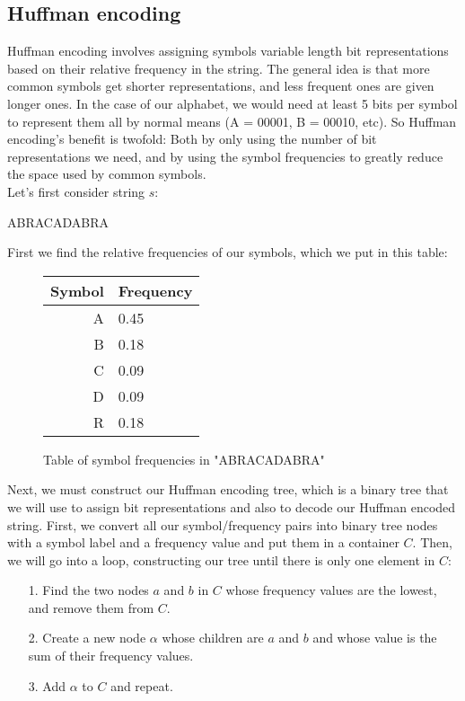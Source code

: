 \documentclass[11pt]{article}
\begin{document}
\subsection{Huffman encoding}\label{huffman-subsect}
Huffman encoding involves assigning symbols variable length bit representations based on their relative 
frequency in the string. The general idea is that more common symbols get shorter representations, 
and less frequent ones are given longer ones. In the case of our alphabet, we would need at least 5 
bits per symbol to represent them all by normal means (A = 00001, B = 00010, etc). So Huffman encoding's 
benefit is twofold: Both by only using the number of bit representations we need, 
and by using the symbol frequencies to greatly reduce the space used by common symbols.\\
Let's first consider string $s$:
\begin{center}ABRACADABRA\end{center}
First we find the relative frequencies of our symbols, which we put in this table:\\
\begin{figure}[H]\begin{center}\begin{tabular}{ r | l }
	Symbol & Frequency \\
	\hline
	A & 0.45 \\
	B & 0.18 \\
	C & 0.09 \\
	D & 0.09 \\
	R & 0.18 \\
\end{tabular}\caption{Table of symbol frequencies in "ABRACADABRA"}\end{center}\end{figure}
Next, we must construct our Huffman encoding tree, which is a binary tree that we will use to assign bit representations 
and also to decode our Huffman encoded string. First, we convert all our symbol/frequency pairs into binary tree nodes 
with a symbol label and a frequency value and put them in a container $C$. Then, we will go into a loop, constructing 
our tree until there is only one element in $C$:
\begin{itemize}
	\item[1.] Find the two nodes $a$ and $b$ in $C$ whose frequency values are the lowest, and remove them from $C$.
	\item[2.] Create a new node $\alpha$ whose children are $a$ and $b$ and whose value is the sum of their frequency values. 
	\item[3.] Add $\alpha$ to $C$ and repeat. 
\end{itemize}
\end{document}
